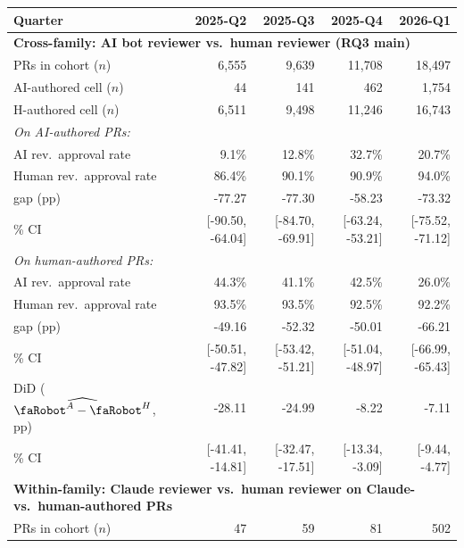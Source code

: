 \begin{table}[h]
\centering
\footnotesize
\setlength{\tabcolsep}{4pt}
\begin{tabular}{lrrrr}
\toprule
Quarter & 2025-Q2 & 2025-Q3 & 2025-Q4 & 2026-Q1 \\
\midrule
\multicolumn{5}{l}{\textbf{Cross-family: AI bot reviewer vs.\ human reviewer (RQ3 main)}} \\
PRs in cohort ($n$)               & 6,555{}     & 9,639{}     & 11,708{}     & 18,497{}     \\
\quad AI-authored cell ($n$)      & 44{}   & 141{}   & 462{}   & 1,754{}   \\
\quad H-authored cell ($n$)       & 6,511{}    & 9,498{}    & 11,246{}    & 16,743{}    \\
\multicolumn{5}{l}{\emph{On AI-authored PRs:}} \\
\quad AI rev.\ approval rate         & 9.1\%{}   & 12.8\%{}   & 32.7\%{}   & 20.7\%{}   \\
\quad Human rev.\ approval rate      & 86.4\%{}   & 90.1\%{}   & 90.9\%{}   & 94.0\%{}   \\
\quad gap (pp)                       & -77.27{}   & -77.30{}   & -58.23{}   & -73.32{}   \\
\qquad 95\% CI                       & [-90.50, -64.04]{} & [-84.70, -69.91]{} & [-63.24, -53.21]{} & [-75.52, -71.12]{} \\
\multicolumn{5}{l}{\emph{On human-authored PRs:}} \\
\quad AI rev.\ approval rate         & 44.3\%{}   & 41.1\%{}   & 42.5\%{}   & 26.0\%{}   \\
\quad Human rev.\ approval rate      & 93.5\%{}   & 93.5\%{}   & 92.5\%{}   & 92.2\%{}   \\
\quad gap (pp)                       & -49.16{}   & -52.32{}   & -50.01{}   & -66.21{}   \\
\qquad 95\% CI                       & [-50.51, -47.82]{} & [-53.42, -51.21]{} & [-51.04, -48.97]{} & [-66.99, -65.43]{} \\
DiD ($\widehat{\rbt^A - \rbt^H}$, pp) & -28.11{}  & -24.99{}  & -8.22{}  & -7.11{}  \\
\quad 95\% CI                       & [-41.41, -14.81]{}& [-32.47, -17.51]{}& [-13.34, -3.09]{}& [-9.44, -4.77]{}\\
\midrule
\multicolumn{5}{l}{\textbf{Within-family: Claude reviewer vs.\ human reviewer on Claude- vs.\ human-authored PRs}} \\
PRs in cohort ($n$)               & 47{}    & 59{}    & 81{}    & 502{}    \\

\end{tabular}
\end{table}
